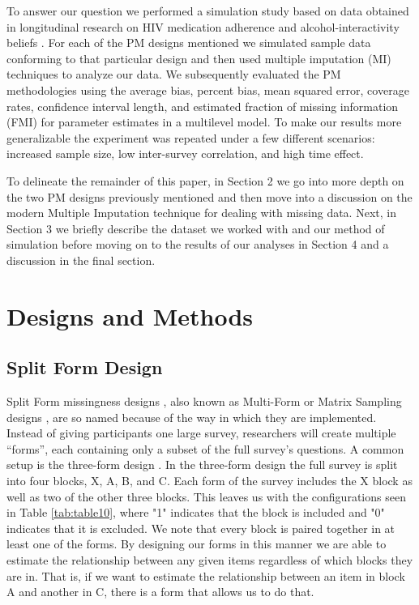 \documentclass{svjour3}                     %
\begin{document}
To answer our question we performed a simulation study based on data obtained in longitudinal research on HIV medication adherence and alcohol-interactivity beliefs \citep{pellowski2016alcohol}. For each of the PM designs mentioned we simulated sample data conforming to that particular design and then used multiple imputation (MI) \citep{little2014statistical}  techniques to analyze our data. We subsequently evaluated the PM methodologies using the average bias, percent bias, mean squared error, coverage rates, confidence interval length, and estimated fraction of missing information (FMI) \citep{little2014statistical} for parameter estimates in a multilevel model. To make our results more generalizable the experiment was repeated under a few different scenarios: increased sample size, low inter-survey correlation, and high time effect. \par

To delineate the remainder of this paper, in Section 2 we go into more depth on the two PM designs previously mentioned and then move into a discussion on the modern Multiple Imputation technique for dealing with missing data. Next, in Section 3 we briefly describe the dataset we worked with and our method of simulation before moving on to the results of our analyses in Section 4 and a discussion in the final section. \par

\section{Designs and Methods}
\label{sec:1}
\subsection{Split Form Design}
\label{sec:1.1}

Split Form missingness designs \citep{raghunathan1995split}, also  known as Multi-Form \citep{little2013planned} or Matrix Sampling designs \citep{thomas2006evaluation}, are so named because of the way in which they are implemented. Instead of giving participants one large survey, researchers will create multiple “forms”, each containing only a subset of the full survey’s questions. A common setup is the three-form design \citep{graham1996maximizing}. In the three-form design the full survey is split into four blocks, X, A, B, and C. Each form of the survey includes the X block as well as two of the other three blocks. This leaves us with the configurations seen in Table \ref{tab:table10}, where "1" indicates that the block is included and "0" indicates that it is excluded. We note that every block is paired together in at least one of the forms. By designing our forms in this manner we are able to estimate the relationship between any given items regardless of which blocks they are in. That is, if we want to estimate the relationship between an item in block A and another in C, there is a form that allows us to do that. \par
\end{document}
